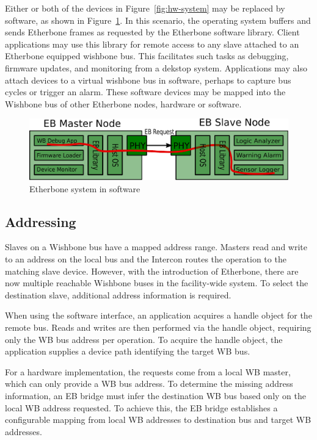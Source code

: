 \documentclass{article}
\begin{document}
Either or both of the devices in Figure~\ref{fig:hw-system} may be replaced by software,
as shown in Figure~\ref{fig:sw-system}.
In this scenario,
the operating system buffers and sends Etherbone frames as requested by the
Etherbone software library.
Client applications may use this library for remote access to
any slave attached to an Etherbone equipped wishbone bus.
This facilitates such tasks as debugging, firmware updates, and monitoring from a
dekstop system.
Applications may also attach devices to a virtual wishbone bus in software,
perhaps to capture bus cycles or trigger an alarm.
These software devices may be mapped into the Wishbone bus of other Etherbone nodes,
hardware or software.

\begin{figure}[t]
\centering%
\includegraphics[width=\columnwidth]{software}
\caption{Etherbone system in software}
\label{fig:sw-system}
\end{figure}

\subsection{Addressing}

Slaves on a Wishbone bus have a mapped address range.
Masters read and write to an address on the local bus
and the Intercon routes the operation to the matching slave device.
However, with the introduction of Etherbone, 
there are now multiple reachable Wishbone buses in the facility-wide system.
To select the destination slave, additional address information is required.

When using the software interface,
an application acquires a handle object for the remote bus.
Reads and writes are then performed via the handle object,
requiring only the WB bus address per operation.
To acquire the handle object, 
the application supplies a device path identifying the target WB bus.

For a hardware implementation,
the requests come from a local WB master,
which can only provide a WB bus address.
To determine the missing address information,
an EB bridge must infer the destination WB bus 
based only on the local WB address requested.
To achieve this,
the EB bridge establishes a configurable mapping from local WB addresses to
destination bus and target WB addresses.
\end{document}
